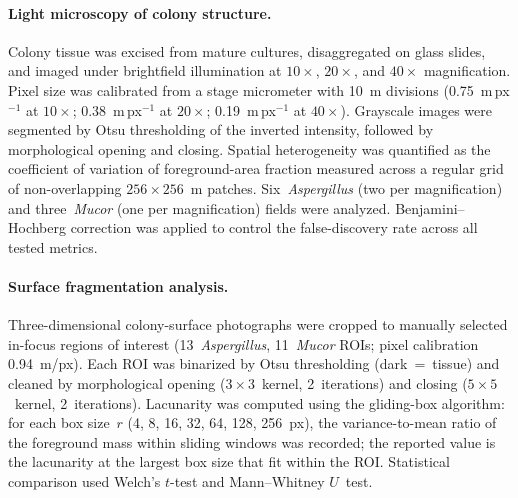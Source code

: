 \paragraph{Light microscopy of colony structure.}
Colony tissue was excised from mature cultures, disaggregated on
glass slides, and imaged under brightfield illumination at
$10\times$, $20\times$, and $40\times$ magnification.  Pixel size
was calibrated from a stage micrometer with 10~\textmu m divisions
(0.75~\textmu m\,px$^{-1}$ at $10\times$;
0.38~\textmu m\,px$^{-1}$ at $20\times$;
0.19~\textmu m\,px$^{-1}$ at $40\times$).  Grayscale images were
segmented by Otsu thresholding of the inverted intensity, followed
by morphological opening and closing.  Spatial heterogeneity was
quantified as the coefficient of variation of foreground-area
fraction measured across a regular grid of non-overlapping
$256 \times 256$~\textmu m patches.  Six~\textit{Aspergillus}
(two per magnification) and three~\textit{Mucor} (one per
magnification) fields were analyzed.  Benjamini--Hochberg
correction was applied to control the false-discovery rate across
all tested metrics.



\paragraph{Surface fragmentation analysis.}
Three-dimensional colony-surface photographs were cropped to
manually selected in-focus regions of interest
(13~\textit{Aspergillus}, 11~\textit{Mucor} ROIs; pixel
calibration 0.94~\textmu m/px).  Each ROI was binarized by Otsu
thresholding (dark~=~tissue) and cleaned by morphological opening
($3 \times 3$~kernel, 2~iterations) and closing
($5 \times 5$~kernel, 2~iterations).  Lacunarity was computed
using the gliding-box algorithm: for each box size~$r$
(4, 8, 16, 32, 64, 128, 256~px), the variance-to-mean ratio
of the foreground mass within sliding windows was recorded;
the reported value is the lacunarity at the largest box size
that fit within the ROI.  Statistical comparison used Welch's
$t$-test and Mann--Whitney $U$~test.


%

